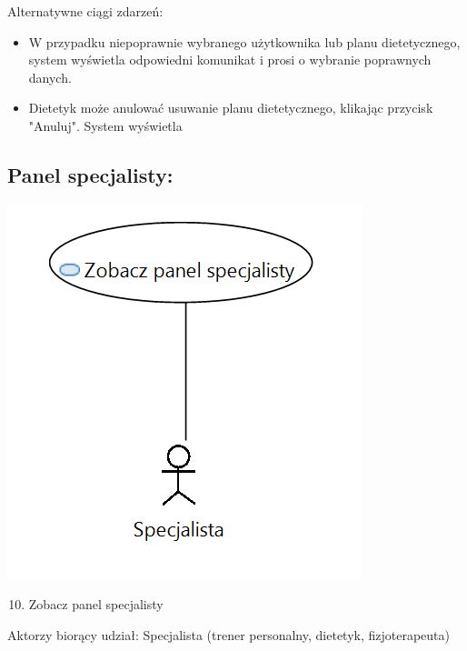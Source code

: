 \documentclass[
]{article}
\providecommand{\tightlist}{%
  \setlength{\itemsep}{0pt}\setlength{\parskip}{0pt}}
\begin{document}
{Alternatywne ciągi zdarzeń:}

\begin{itemize}
\tightlist
\item
  {W przypadku niepoprawnie wybranego użytkownika lub planu
  dietetycznego, system wyświetla odpowiedni komunikat i prosi o
  wybranie poprawnych danych.}
\item
  {Dietetyk może anulować usuwanie planu dietetycznego, klikając
  przycisk "Anuluj". System wyświetla}
\end{itemize}

\hypertarget{h.moo0g2hu8rf}{%
\subsection{\texorpdfstring{{}}{}}\label{h.moo0g2hu8rf}}

\hypertarget{h.8of6ai7v3sbh}{%
\subsection{\texorpdfstring{{Panel
specjalisty:}}{Panel specjalisty:}}\label{h.8of6ai7v3sbh}}

{\includegraphics{diagrams/use_cases/zobacz_panel_specjalisty.png}}

\begin{enumerate}
\setcounter{enumi}{9}
\tightlist
\item
  {Zobacz panel specjalisty}
\end{enumerate}

{Aktorzy biorący udział: Specjalista (trener personalny, dietetyk,
fizjoterapeuta)}
\end{document}
